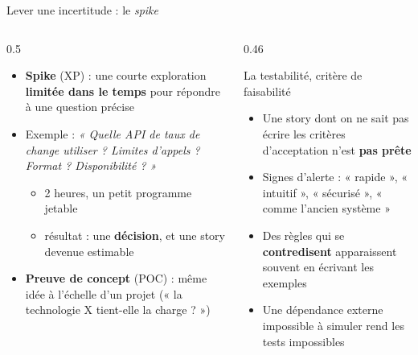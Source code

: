 \documentclass[aspectratio=169,10pt]{beamer}
\begin{document}
\begin{frame}{Lever une incertitude : le \textit{spike}}
  \begin{columns}[T]
    \begin{column}{0.5\textwidth}
      \begin{itemize}
        \item \textbf{Spike} (XP) : une courte exploration \textbf{limitée dans le temps} pour répondre à une question précise
        \item Exemple : \textit{« Quelle API de taux de change utiliser ? Limites d'appels ? Format ? Disponibilité ? »}
          \begin{itemize}
            \item 2 heures, un petit programme jetable
            \item résultat : une \textbf{décision}, et une story devenue estimable
          \end{itemize}
        \item \textbf{Preuve de concept} (POC) : même idée à l'échelle d'un projet (« la technologie X tient-elle la charge ? »)
      \end{itemize}
    \end{column}
    \begin{column}{0.46\textwidth}
      \begin{block}{La testabilité, critère de faisabilité}
        \begin{itemize}
          \item Une story dont on ne sait pas écrire les critères d'acceptation n'est \textbf{pas prête}
          \item Signes d'alerte : « rapide », « intuitif », « sécurisé », « comme l'ancien système »
          \item Des règles qui se \textbf{contredisent} apparaissent souvent en écrivant les exemples
          \item Une dépendance externe impossible à simuler rend les tests impossibles
        \end{itemize}
      \end{block}
    \end{column}
  \end{columns}
\end{frame}
\end{document}

